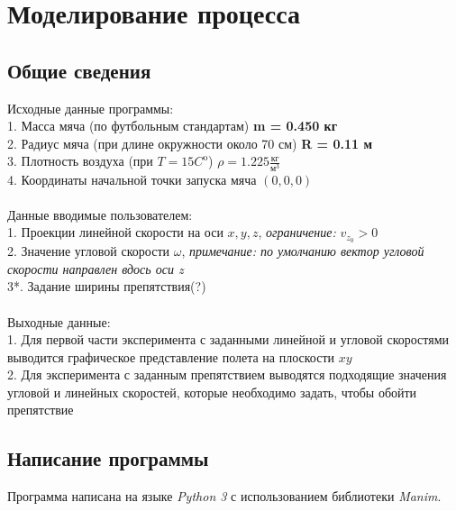 \documentclass[a5paper, 10pt]{article}
\theoremstyle{definition}
\theoremstyle{plain}
\theoremstyle{remark}
\begin{document}
\section{Моделирование процесса}
\subsection{Общие сведения}
Исходные данные программы:\\
1. Масса мяча (по футбольным стандартам) \textbf{m = 0.450 кг}\\
2. Радиус мяча (при длине окружности около 70 см)  \textbf{R = 0.11 м}\\
3. Плотность воздуха (при $T = 15 C^{\text{o}}$) $\rho = 1.225 \frac{\text{кг}}{\text{м}^3}$\\
4. Координаты начальной точки запуска мяча $(0, 0, 0)$\\\\
Данные вводимые пользователем:\\
1. Проекции линейной скорости на оси $x, y, z$, \textit{ограничение: }  $v_{z_{0}} > 0$\\
2. Значение угловой скорости $\omega$, \textit{ примечание: по умолчанию вектор угловой скорости направлен вдось оси z }\\
3*. Задание ширины препятствия(?)\\\\
Выходные данные:\\
1. Для первой части эксперимента с заданными линейной и угловой скоростями выводится графическое представление полета на плоскости $xy$\\
2. Для эксперимента с заданным препятствием выводятся подходящие значения угловой и линейных скоростей, которые необходимо задать, чтобы обойти препятствие\\


\subsection{Написание программы}
Программа написана на языке \textit{Python 3} с использованием библиотеки \textit{Manim}.
\end{document}
